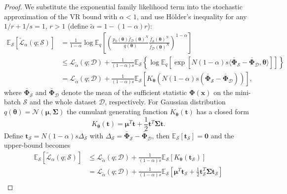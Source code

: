 \begin{proof}
We substitute the exponential family likelihood term into the stochastic approximation of the VR bound with $\alpha < 1$, and use H{\"o}lder's inequality for any $1/r + 1/s = 1$, $r > 1$ (define $\tilde{\alpha} = 1 - (1 - \alpha) r$):
\begin{equation*}
\begin{aligned}
\mathbb{E}_{\mathcal{S}} [\tilde{\mathcal{L}}_{\alpha}(q; \mathcal{S})] 
    &= \frac{1}{1 - \alpha} \log \mathbb{E}_{q} [ \left( \frac{p_0(\bm{\theta}) \bar{f}_{\mathcal{D}}(\bm{\theta})^N} {q(\bm{\theta})} \frac{\bar{f}_{\mathcal{S}}(\bm{\theta})^N}{\bar{f}_{\mathcal{D}}(\bm{\theta})^N}  \right)^{1 - \alpha} ] \\
	&\leq \mathcal{L}_{\tilde{\alpha}}(q; \mathcal{D}) + \frac{1}{(1 - \alpha)s} \mathbb{E}_{\mathcal{S}} \left\lbrace \log \mathbb{E}_{q} [ \exp [N(1 - \alpha) s \langle \bar{\bm{\Phi}}_{\mathcal{S}} - \bar{\bm{\Phi}}_{\mathcal{D}}, \bm{\theta} \rangle ] ] \right\rbrace \\
	&= \mathcal{L}_{\tilde{\alpha}}(q; \mathcal{D}) + \frac{1}{(1 - \alpha)s} \mathbb{E}_{\mathcal{S}} [K_{\bm{\theta}}(N(1 - \alpha) s (\bar{\bm{\Phi}}_{\mathcal{S}} - \bar{\bm{\Phi}}_{\mathcal{D}})) ],
\end{aligned}
\end{equation*}
where $\bar{\bm{\Phi}}_{\mathcal{S}}$ and $\bar{\bm{\Phi}}_{\mathcal{D}}$ denote the mean of the sufficient statistic $\bm{\Phi}(\bm{x})$ on the mini-batch $\mathcal{S}$ and the whole dataset $\mathcal{D}$, respectively. For Gaussian distribution $q(\bm{\theta}) = \mathcal{N}(\bm{\mu}, \bm{\Sigma})$ the cumulant generating function $K_{\bm{\theta}}(\bm{t})$ has a closed form
\begin{equation*}
K_{\bm{\theta}}(\bm{t}) = \bm{\mu}^T\bm{t} + \frac{1}{2} \bm{t}^T \bm{\Sigma} \bm{t}.
\end{equation*}
Define $\bm{t}_{\mathcal{S}} = N(1 - \alpha) s \Delta_{\mathcal{S}}$ with $\Delta_{\mathcal{S}} = \bar{\bm{\Phi}}_{\mathcal{S}} - \bar{\bm{\Phi}}_{\mathcal{D}}$, then $\mathbb{E}_{\mathcal{S}}[\bm{t}_{\mathcal{S}}] = \bm{0}$ and the upper-bound becomes
\begin{equation*}
\begin{aligned}
\mathbb{E}_{\mathcal{S}} [\tilde{\mathcal{L}}_{\alpha}(q; \mathcal{S})] 
	&\leq \mathcal{L}_{\tilde{\alpha}}(q; \mathcal{D}) + \frac{1}{(1 - \alpha)s} \mathbb{E}_{\mathcal{S}} [K_{\bm{\theta}}(\bm{t}_{\mathcal{S}}) ]\\
	&= \mathcal{L}_{\tilde{\alpha}}(q; \mathcal{D}) + \frac{1}{(1 - \alpha)s} \mathbb{E}_{\mathcal{S}} [\bm{\mu}^T\bm{t}_{\mathcal{S}} + \frac{1}{2} \bm{t}_{\mathcal{S}}^T \bm{\Sigma} \bm{t}_{\mathcal{S}} ] \\

\end{aligned}
\end{equation*}
\end{proof}
